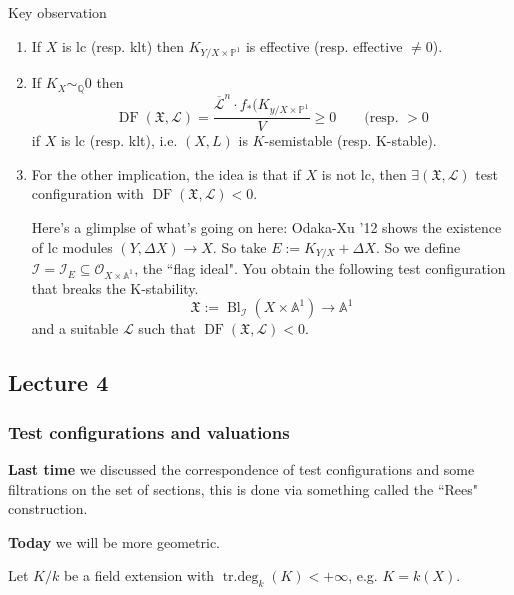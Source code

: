 \begin{thing6}{Key observation}\leavevmode
\begin{enumerate}
\item If \(X\) is lc (resp. klt) then  \(K_{Y/X \times \mathbb{P}^1}\) is effective (resp. effective \(\neq 0\)).
\item If \(K_X \sim_\mathbb{Q} 0\) then \[\operatorname{DF}(\mathfrak{X},\mathcal{L})=\frac{\overline{\mathcal{L}}^n\cdot f_*(K_{y/X \times \mathbb{P}^1}}{V} \geq 0 \qquad \text{(resp. \(>0\)} \]
	if \(X\) is lc (resp. klt), i.e. \((X,L)\) is \(K\)-semistable (resp. K-stable).

\item For the other implication, the idea is that if \(X\) is not lc, then \(\exists  (\mathfrak{X},\mathcal{L})\) test configuration with \(\operatorname{D F}(\mathfrak{X},\mathcal{L})<0\).

	Here's a glimplse of what's going on here: Odaka-Xu '12 shows the existence of lc modules \((Y,\Delta X) \to X\). So take \(E:= K_{Y/X}+ \Delta X\). So we define \(\mathcal{I}=\mathcal{I}_E\subseteq \mathcal{O}_{X \times \mathbb{A}^1}\), the ``flag ideal". You obtain the following test configuration that breaks the K-stability.
	\[\mathfrak{X}:= \operatorname{Bl}_\mathcal{I}(X \times \mathbb{A}^1) \to \mathbb{A}^1\]
	and a suitable \(\mathcal{L}\) such that \(\operatorname{D F}(\mathfrak{X},\mathcal{L})<0\).
\end{enumerate}
\end{thing6}

\subsection{Lecture 4}

\subsubsection{Test configurations and valuations}

{\color{7}\bfseries Last time}\hspace{.5em} we discussed the correspondence of test configurations and some filtrations on the set of sections, this is done via something called the ``Rees" construction.

{\color{7}\bfseries Today}\hspace{.5em} we will be more geometric.

Let \(K/k\) be a field extension with \(\operatorname{tr.deg}_k(K)<+\infty\), e.g. \(K=k(X)\).

